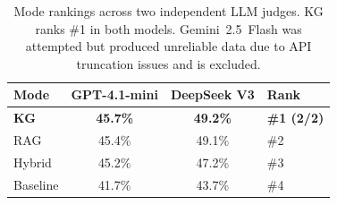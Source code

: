 
\begin{table}[t]
\centering
\caption{Mode rankings across two independent LLM judges. KG ranks \#1 in both models. Gemini~2.5~Flash was attempted but produced unreliable data due to API truncation issues and is excluded.}
\label{tab:mode-averages}
\begin{tabular}{lccl}
\toprule
\textbf{Mode} & \textbf{GPT-4.1-mini} & \textbf{DeepSeek V3} & \textbf{Rank} \\
\midrule
\textbf{KG}   & \textbf{45.7\%} & \textbf{49.2\%} & \textbf{\#1 (2/2)} \\
RAG            & 45.4\%          & 49.1\%          & \#2 \\
Hybrid         & 45.2\%          & 47.2\%          & \#3 \\
Baseline       & 41.7\%          & 43.7\%          & \#4 \\
\bottomrule
\end{tabular}
\end{table}




